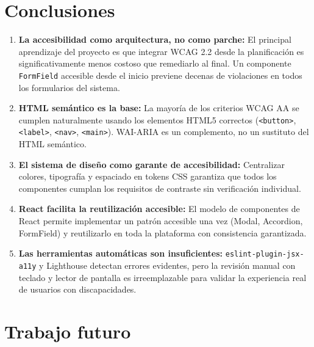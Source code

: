 \documentclass[12pt, a4paper]{report}
\begin{document}
\section{Conclusiones}

\begin{enumerate}
  \item \textbf{La accesibilidad como arquitectura, no como parche:} El principal aprendizaje del proyecto es que integrar WCAG 2.2 desde la planificación es significativamente menos costoso que remediarlo al final. Un componente \texttt{FormField} accesible desde el inicio previene decenas de violaciones en todos los formularios del sistema.

  \item \textbf{HTML semántico es la base:} La mayoría de los criterios WCAG AA se cumplen naturalmente usando los elementos HTML5 correctos (\texttt{<button>}, \texttt{<label>}, \texttt{<nav>}, \texttt{<main>}). WAI-ARIA es un complemento, no un sustituto del HTML semántico.

  \item \textbf{El sistema de diseño como garante de accesibilidad:} Centralizar colores, tipografía y espaciado en tokens CSS garantiza que todos los componentes cumplan los requisitos de contraste sin verificación individual.

  \item \textbf{React facilita la reutilización accesible:} El modelo de componentes de React permite implementar un patrón accesible una vez (Modal, Accordion, FormField) y reutilizarlo en toda la plataforma con consistencia garantizada.

  \item \textbf{Las herramientas automáticas son insuficientes:} \texttt{eslint-plugin-jsx-a11y} y Lighthouse detectan errores evidentes, pero la revisión manual con teclado y lector de pantalla es irreemplazable para validar la experiencia real de usuarios con discapacidades.
\end{enumerate}

\section{Trabajo futuro}
\end{document}
